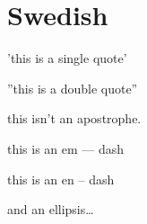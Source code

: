 
\def\mytitle{MultiMarkdown Swedish Test}

\part{Swedish}
\label{swedish}

'this is a single quote'

''this is a double quote''

this isn't an apostrophe.

this is an em --- dash

this is an en -- dash

and an ellipsis{\ldots}




